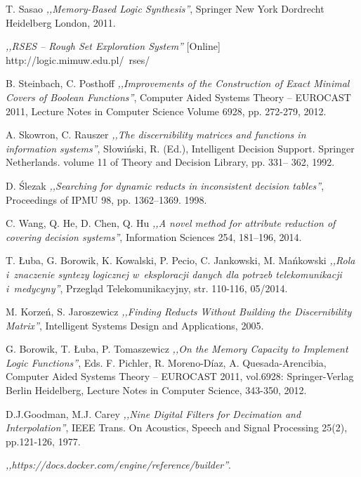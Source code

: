 \begin{thebibliography}{99}
 T. Sasao \emph{,,Memory-Based Logic Synthesis''}, Springer New York Dordrecht Heidelberg London, 2011.

 \emph{,,RSES – Rough Set Exploration System''} [Online] http://logic.mimuw.edu.pl/~rses/

 B. Steinbach, C. Posthoff \emph{,,Improvements of the Construction of Exact Minimal Covers of Boolean Functions''}, Computer Aided Systems Theory – EUROCAST 2011, Lecture Notes in Computer Science Volume 6928, pp. 272-279, 2012.

 A. Skowron, C. Rauszer \emph{,,The discernibility matrices and functions in information systems''}, Słowiński, R. (Ed.), Intelligent Decision Support. Springer Netherlands. volume 11 of Theory and Decision Library, pp. 331– 362, 1992.

 D. Ślezak \emph{,,Searching for dynamic reducts in inconsistent decision tables''}, Proceedings of IPMU 98, pp. 1362–1369. 1998.

 C. Wang, Q. He, D. Chen, Q. Hu \emph{,,A novel method for attribute reduction of covering decision systems''}, Information Sciences 254, 181–196, 2014.

 T. Łuba, G. Borowik, K. Kowalski, P. Pecio, C. Jankowski, M. Mańkowski \emph{,,Rola i~znaczenie syntezy logicznej w~eksploracji danych dla potrzeb telekomunikacji i~medycyny''}, Przegląd Telekomunikacyjny, str. 110-116, 05/2014.

 M. Korzeń, S. Jaroszewicz \emph{,,Finding Reducts Without Building the Discernibility Matrix''}, Intelligent Systems Design and Applications, 2005.

 G. Borowik, T. Łuba, P. Tomaszewicz \emph{,,On the Memory Capacity to Implement Logic Functions''}, Eds. F. Pichler, R. Moreno-Díaz, A. Quesada-Arencibia, Computer Aided Systems Theory – EUROCAST 2011, vol.6928: Springer-Verlag Berlin Heidelberg, Lecture Notes in Computer Science, 343-350, 2012.

 D.J.Goodman, M.J. Carey \emph{,,Nine Digital Filters for Decimation and Interpolation''}, IEEE Trans. On Acoustics, Speech and Signal Processing 25(2), pp.121-126, 1977.

  \emph{,,https://docs.docker.com/engine/reference/builder''}.

\end{thebibliography}
\clearpage




